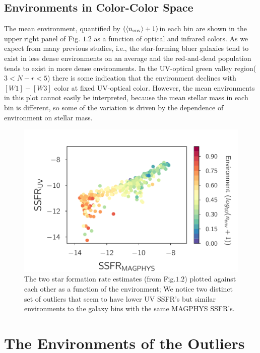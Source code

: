 \subsection{Environments in Color-Color Space}

The mean environment, quantified by $(\langle n_{\rm env}\rangle + 1)$in each bin are shown in the upper right panel of Fig. $1.2$ as a function of optical and infrared colors. As we expect from many previous studies, i.e., the star-forming bluer galaxies tend to exist in less dense environments on an average and the red-and-dead population tends to exist in more dense environments. In the UV-optical green valley region($3 < N-r < 5$) there is some indication that the environment declines with $[W1]-[W3]$ color at fixed UV-optical color. However, the mean environments in this plot cannot easily be interpreted, because the mean stellar mass in each bin is different, so some of the variation is driven by the dependence of environment on stellar mass.

\begin{figure}
\includegraphics[width=\textwidth]{figures/2_env_plot.pdf}
\caption[Short figure name.]{The two star formation rate estimates (from Fig.$1.2$) plotted against each other as a function of the environment; We notice two distinct set of outliers that seem to have lower UV SSFR's but similar environments to the galaxy bins with the same MAGPHYS SSFR's.
\label{fig:myInlineFigure}}
\end{figure}

\section{The Environments of the Outliers}

